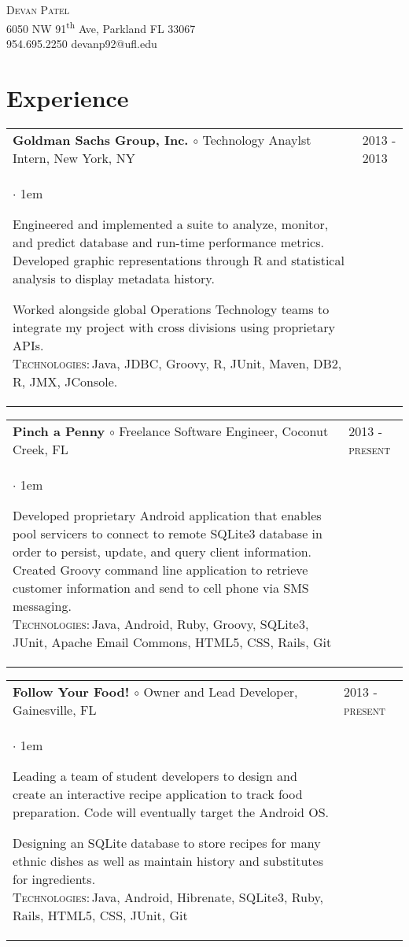 \documentclass[11pt]{article}
\makeatletter
\newcommand{\employer}[4]
	{{ \begin{tabular}{l@{\hspace{5mm}}|p{30mm}}
	   \multicolumn{1}{l}{\textbf{#1 $\circ$ }#2}&\multicolumn{1}{p{30mm}}{\hspace{-3mm}\textsc{#3}} \\
	   \parbox{.825\textwidth}{#4 \vspace*{-4pt}}
	   \end{tabular} \vspace{4pt} }}
\newcommand{\contact}[4]
	{\begin{center}
		{\LARGE \scshape{#1}}\\
		#2\\
		\Telefon \hspace{0.5ex} #3 \hspace{1em} \Letter \hspace{0.5ex} #4
	\end{center}
	\vspace*{-8pt}}
\newenvironment{achievements}           %
	{\begin{list}{$\cdot$}{\topsep 0pt \itemsep 4pt \parsep 0pt \leftmargin 1em}
	 \linespread{1.05} \selectfont %
	}
	{\end{list}\vspace*{4pt}}
\def\kt{\vspace*{2pt}\\\textsc{Technologies:\,}}
\makeatother
\begin{document}
\contact{Devan Patel}
{6050 NW 91\textsuperscript{th} Ave, Parkland FL 33067}
{954.695.2250}
{devanp92@ufl.edu}

\section{Experience}
\employer{Goldman Sachs Group, Inc.}{Technology Anaylst Intern, New York, NY}{2013 - 2013}{
	\begin{achievements}
	
	\item{Engineered and implemented a suite to analyze, monitor, and predict database and run-time performance metrics. Developed graphic representations through R and statistical analysis to display metadata history.}
		
	\item{Worked alongside global Operations Technology teams to integrate my project with cross divisions using proprietary APIs.\kt Java, JDBC, Groovy, R, JUnit, Maven, DB2, R, JMX, JConsole.}

	\end{achievements} 
}


\employer{Pinch a Penny}{Freelance Software Engineer, Coconut Creek, FL}{2013 - present}{
	\begin{achievements}
	
	\item{Developed proprietary Android application that enables pool servicers to connect to remote SQLite3 database in order to persist, update, and query client information. Created Groovy command line application to retrieve customer information and send to cell phone via SMS messaging.  \kt Java, Android, Ruby, Groovy, SQLite3, JUnit, Apache Email Commons, HTML5, CSS, Rails, Git}
	
	\end{achievements}
}

\employer{Follow Your Food!}{Owner and Lead Developer, Gainesville, FL}{2013 - present}{
	\begin{achievements}
	
	\item{Leading a team of student developers to design and create an interactive recipe application to track food preparation. Code will eventually target the Android OS.}
	
	\item{Designing an SQLite database to store recipes for many ethnic dishes as well as maintain history and substitutes for ingredients.\kt Java, Android, Hibrenate, SQLite3, Ruby, Rails, HTML5, CSS, JUnit, Git}
	
	\end{achievements}
}
\end{document}
